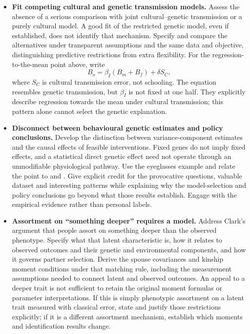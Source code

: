 \begin{itemize}
$\log\theta_k$ is therefore not a common intercept shift: it can alter
the fitted kinship-decay slope and lineal--collateral contrast used to
recover the structural parameters. Allowing one free $\theta$ does not
generally repair this misspecification; allowing a separate unrestricted
$\theta_k$ for every kinship type would instead remove the cross-kinship
restrictions that make the model informative. A threshold model should
derive these transformations from prevalences and latent correlations.
This population example isolates measurement-scale
misspecification from sampling error; quantify its practical importance
at the prevalences and correlations relevant to Clark's data.
\item \textbf{Fit competing cultural and genetic transmission models.}
Assess the absence of a serious comparison with joint cultural--genetic
transmission or a purely cultural model. A good fit of the restricted
genetic model, even if established, does not identify that mechanism.
Specify and compare the alternatives under transparent assumptions and
the same data and objective, distinguishing predictive restrictions
from extra flexibility. For the regression-to-the-mean point above,
\citet[pp.~8--9, eq.~8]{OttoEtAl1994} write
\[
 B_o=\beta_I(B_m+B_f)+\delta S_C,
\]
where $S_C$ is cultural transmission error, not schooling. The equation
resembles genetic transmission, but $\beta_I$ is not fixed at one half.
They explicitly describe regression towards the mean under cultural
transmission; this pattern alone cannot select the genetic explanation.
\item \textbf{Disconnect between behavioural genetic estimates and policy conclusions.}
Develop the distinction between variance-component estimates and the
causal effects of feasible interventions. Fixed genes do not imply
fixed effects, and a statistical direct genetic effect need not operate
through an unmodifiable physiological pathway. Use the eyeglasses
example and relate the point to \citet{Goldberger1978} and
\citet{Jencks1980}. Give explicit credit for the provocative questions,
valuable dataset and interesting patterns while explaining why the
model-selection and policy conclusions go beyond what those results
establish. Engage with the empirical evidence rather than personal labels.

\item \textbf{Assortment on ``something deeper'' requires a model.}
Address Clark's argument that people assort on something deeper than
the observed phenotype. Specify what that latent characteristic is,
how it relates to observed outcomes and their genetic and environmental
components, and how it governs partner selection. Derive the spouse
covariances and kinship moment conditions under that matching rule,
including the measurement assumptions needed to connect latent and
observed outcomes. An appeal to a deeper trait is not sufficient to
retain the original moment formulas or parameter interpretations.
If this is simply phenotypic assortment on a latent trait measured with
classical error, state and justify those restrictions explicitly; if it
is a different assortment mechanism, establish which moments and
identification results change.


\end{itemize}
